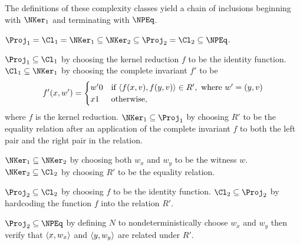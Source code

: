 The definitions of these complexity classes yield a chain of inclusions beginning with $\NKer_1$ and terminating with $\NPEq$.
\begin{theorem}\label{thm:definitions}
  $\Proj_1 = \Cl_1 = \NKer_1 \subseteq \NKer_2 \subseteq \Proj_2 = \Cl_2 \subseteq \NPEq$.
\end{theorem}
\begin{sketch}
  $\Proj_1 \subseteq \Cl_1$ by choosing the kernel reduction $f$ to be the identity function.
  $\Cl_1 \subseteq \NKer_1$ by choosing the complete invariant $f'$ to be
  \begin{equation*}
    f'(x, w') =
    \begin{cases}
      w'0 & \text{if } \langle f(x, v),f(y, v)\rangle \in R', \text{ where } w' = (y, v) \\
      x1 & \text{otherwise},
    \end{cases}
  \end{equation*}
  where $f$ is the kernel reduction.
  $\NKer_1 \subseteq \Proj_1$ by choosing $R'$ to be the equality relation after an application of the complete invariant $f$ to both the left pair and the right pair in the relation.

  $\NKer_1 \subseteq \NKer_2$ by choosing both $w_x$ and $w_y$ to be the witness $w$.
  $\NKer_2 \subseteq \Cl_2$ by choosing $R'$ to be the equality relation.

  $\Proj_2 \subseteq \Cl_2$ by choosing $f$ to be the identity function.
  $\Cl_2 \subseteq \Proj_2$ by hardcoding the function $f$ into the relation $R'$.

  $\Proj_2 \subseteq \NPEq$ by defining $N$ to nondeterministically choose $w_x$ and $w_y$ then verify that $\langle x,w_x\rangle$ and $\langle y,w_y\rangle$ are related under $R'$.
\end{sketch}

